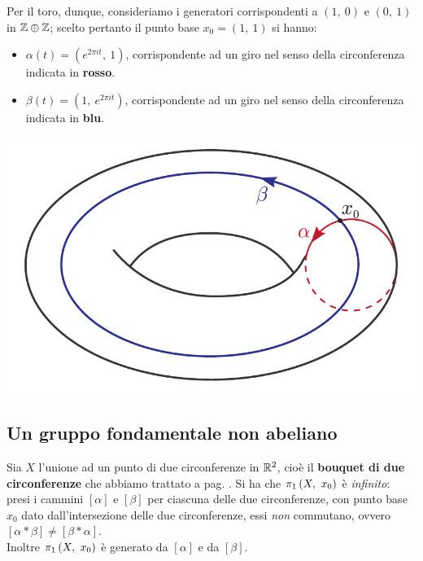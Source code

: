 \begin{minipage}{.52\linewidth}
Per il toro, dunque, consideriamo i generatori corrispondenti a $(1,\ 0)$ e $(0,\ 1)$ in $\mathbb{Z}\oplus\mathbb{Z}$; scelto pertanto il punto base $x_0=(1,\ 1)$ si hanno:
\begin{itemize}
	\item $\alpha(t)=(e^{2\pi i t},\ 1)$, corrispondente ad un giro nel senso della circonferenza indicata in \textcolor{redill}{\textbf{rosso}}.
	\item $\beta(t)=(1,\ e^{2\pi i t})$, corrispondente ad un giro nel senso della circonferenza indicata in \textcolor{blueill}{\textbf{blu}}.
\end{itemize}
\end{minipage}
	\begin{minipage}{.47\linewidth}
		\begin{center}
				\includegraphics[trim=0cm 0cm 0cm 0cm,clip,scale=0.5]{images/torusgenerator.pdf}
		\end{center}
\end{minipage}
\subsection{Un gruppo fondamentale non abeliano}
Sia $X$ l'unione ad un punto di due circonferenze in $\mathbb{R}^2$, cioè il \textbf{bouquet di due circonferenze} che abbiamo trattato a pag. \pageref{bouquet}. Si ha che $\gruf{X}{x_0}$ è \textit{infinito}: presi i cammini $[\alpha]$ e $[\beta]$ per ciascuna delle due circonferenze, con punto base $x_0$ dato dall'intersezione delle due circonferenze, essi \textit{non} commutano, ovvero $[\alpha\ast\beta]\neq [\beta\ast\alpha]$.\\
Inoltre $\gruf{X}{x_0}$ è generato da $[\alpha]$ e da $[\beta]$.
